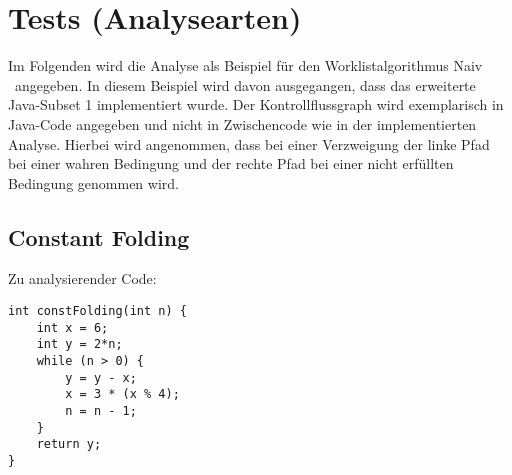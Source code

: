 \section{Tests (Analysearten)}

Im Folgenden wird die Analyse als Beispiel für den Worklistalgorithmus \glqq Naiv \grqq\ angegeben. %
 In diesem Beispiel wird davon ausgegangen, dass das erweiterte Java-Subset 1 implementiert wurde. Der Kontrollflussgraph wird exemplarisch in Java-Code angegeben und nicht in Zwischencode wie in der implementierten Analyse. Hierbei wird angenommen, dass bei einer Verzweigung der linke Pfad bei einer wahren Bedingung und der rechte Pfad bei einer nicht erfüllten Bedingung genommen wird.


\subsection{Constant Folding}

Zu analysierender Code: \par

\begin{lstlisting}[frame=single]
int constFolding(int n) {
	int x = 6;
	int y = 2*n;
	while (n > 0) {
		y = y - x;
		x = 3 * (x % 4);
		n = n - 1;
	}
	return y;
}
\end{lstlisting}

\par

